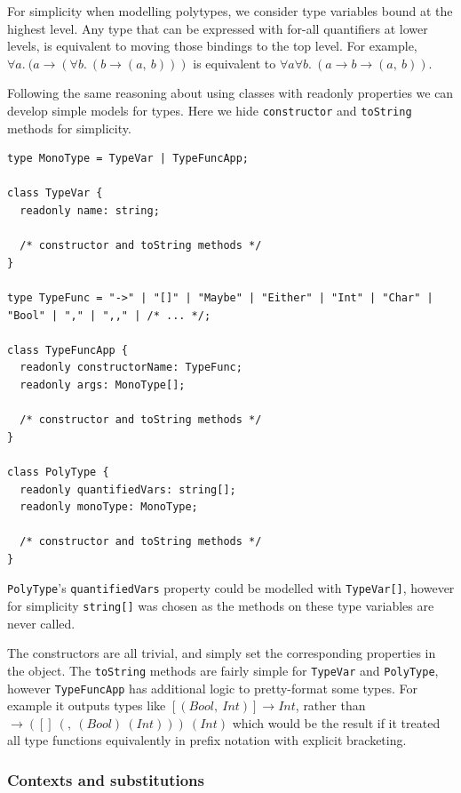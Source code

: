 \documentclass[a4paper,fleqn,oneside,12pt]{report}
\begin{document}
For simplicity when modelling polytypes, we consider type variables bound at the highest level. Any type that can be expressed with for-all quantifiers at lower levels, is equivalent to moving those bindings to the top level. For example, $\forall a.\ (a \rightarrow (\forall b.\ (b \rightarrow (a,\ b)))$ is equivalent to $\forall a \forall b.\ (a \rightarrow b \rightarrow (a,\ b))$.

Following the same reasoning about using classes with readonly properties we can develop simple models for types. Here we hide \texttt{constructor} and \texttt{toString} methods for simplicity.

\begin{verbatim}
type MonoType = TypeVar | TypeFuncApp;

class TypeVar {
  readonly name: string;

  /* constructor and toString methods */
}

type TypeFunc = "->" | "[]" | "Maybe" | "Either" | "Int" | "Char" | "Bool" | "," | ",," | /* ... */;

class TypeFuncApp {
  readonly constructorName: TypeFunc;
  readonly args: MonoType[];

  /* constructor and toString methods */
}

class PolyType {
  readonly quantifiedVars: string[];
  readonly monoType: MonoType;

  /* constructor and toString methods */
}
\end{verbatim}
\texttt{PolyType}'s \texttt{quantifiedVars} property could be modelled with \texttt{TypeVar[]}, however for simplicity \texttt{string[]} was chosen as the methods on these type variables are never called.

The constructors are all trivial, and simply set the corresponding properties in the object. The \texttt{toString} methods are fairly simple for \texttt{TypeVar} and \texttt{PolyType}, however \texttt{TypeFuncApp} has additional logic to pretty-format some types. For example it outputs types like $[(Bool,\ Int)] \rightarrow Int$, rather than $\rightarrow ([]\ (,\ (Bool)\ (Int)))\ (Int)$ which would be the result if it treated all type functions equivalently in prefix notation with explicit bracketing.

\subsubsection{Contexts and substitutions}\label{id:h.ux3btyb2wvh8}
\end{document}
